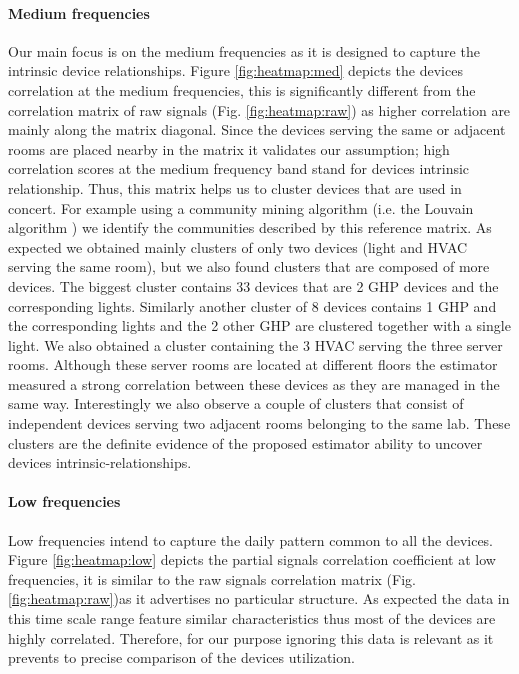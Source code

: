 \paragraph{Medium frequencies}
Our main focus is on the medium frequencies as it is designed to capture the intrinsic device relationships.
Figure \ref{fig:heatmap:med} depicts the devices correlation at the medium frequencies, this is significantly different from the correlation matrix of raw signals (Fig. \ref{fig:heatmap:raw}) as higher correlation are mainly along the matrix diagonal. 
Since the devices serving the same or adjacent rooms are placed nearby in the matrix it validates our assumption; high correlation scores at the medium frequency band stand for devices intrinsic relationship.
Thus, this matrix helps us to cluster devices that are used in concert.
For example using a community mining algorithm (i.e. the Louvain algorithm \cite{blondel:unfolding}) we identify the communities described by this reference matrix.
As expected we obtained mainly clusters of only two devices (light and HVAC serving the same room), but we also found clusters that are composed of more devices.
The biggest cluster contains 33 devices that are 2 GHP devices and the corresponding lights.
Similarly another cluster of 8 devices contains 1 GHP and the corresponding lights and the 2 other GHP are clustered together with a single light.
We also obtained a cluster containing the 3 HVAC serving the three server rooms. Although these server rooms are located at different floors the estimator measured a strong correlation between these devices as they are managed in the same way.
Interestingly we also observe a couple of clusters that consist of independent devices serving two adjacent rooms belonging to the same lab.
These clusters are the definite evidence of the proposed estimator ability to uncover devices intrinsic-relationships.
 
\paragraph{Low frequencies}
Low frequencies intend to capture the daily pattern common to all the devices.
Figure \ref{fig:heatmap:low} depicts the partial signals correlation coefficient at low frequencies, it is similar to the raw signals correlation matrix (Fig. \ref{fig:heatmap:raw})as it advertises no particular structure.
As expected the data in this time scale range feature similar characteristics thus most of the devices are highly correlated.
Therefore, for our purpose ignoring this data is relevant as it prevents to precise comparison of the devices utilization.
 
